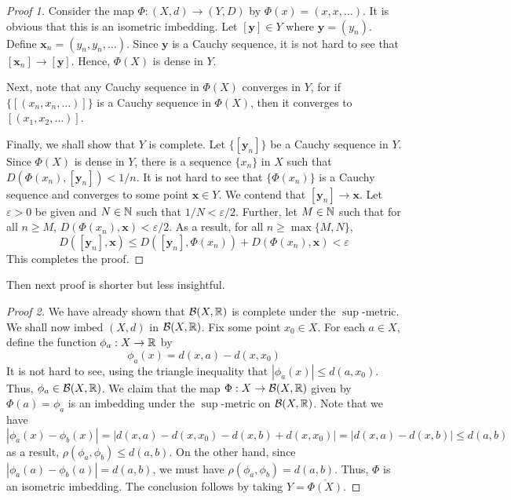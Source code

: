 \begin{proof}[Proof 1]
    Consider the map $\Phi:(X,d)\to(Y,D)$ by $\Phi(x) = (x,x,\ldots)$. It is obvious that this is an isometric imbedding. Let $[\mathbf y]\in Y$ where $\mathbf y = (y_n)$. Define $\mathbf x_n = (y_n,y_n,\ldots)$. Since $\mathbf y$ is a Cauchy sequence, it is not hard to see that $[\mathbf x_n]\to[\mathbf y]$. Hence, $\Phi(X)$ is dense in $Y$. 

    Next, note that any Cauchy sequence in $\Phi(X)$ converges in $Y$, for if $\{[(x_n,x_n,\ldots)]\}$ is a Cauchy sequence in $\Phi(X)$, then it converges to $[(x_1,x_2,\ldots)]$.

    Finally, we shall show that $Y$ is complete. Let $\{[\mathbf y_n]\}$ be a Cauchy sequence in $Y$. Since $\Phi(X)$ is dense in $Y$, there is a sequence $\{x_n\}$ in $X$ such that $D(\Phi(x_n), [\mathbf y_n]) < 1/n$. It is not hard to see that $\{\Phi(x_n)\}$ is a Cauchy sequence and converges to some point $\mathbf x\in Y$. We contend that $[\mathbf y_n]\to\mathbf x$. Let $\varepsilon > 0$ be given and $N\in\mathbb{N}$ such that $1/N < \varepsilon/2$. Further, let $M\in\mathbb{N}$ such that for all $n\ge M$, $D(\Phi(x_n),\mathbf x) < \varepsilon/2$. As a result, for all $n\ge\max\{M, N\}$,
    \begin{equation*}
        D([\mathbf y_n],\mathbf x)\le D([\mathbf y_n],\Phi(x_n)) + D(\Phi(x_n), \mathbf x) < \varepsilon
    \end{equation*}
    This completes the proof.
\end{proof}

Then next proof is shorter but less insightful.
\begin{proof}[Proof 2]
    We have already shown that $\mathcal{B}(X,\mathbb{R})$ is complete under the $\sup$-metric. We shall now imbed $(X,d)$ in $\mathcal{B}(X,\mathbb{R})$. Fix some point $x_0\in X$. For each $a\in X$, define the function $\phi_a: X\to\mathbb{R}$ by 
    \begin{equation*}
        \phi_a(x) = d(x,a) - d(x,x_0)
    \end{equation*}
    It is not hard to see, using the triangle inequality that $|\phi_a(x)|\le d(a, x_0)$. Thus, $\phi_a\in\mathcal{B}(X,\mathbb{R})$. We claim that the map $\Phi:X\to\mathcal{B}(X,\mathbb{R})$ given by $\Phi(a) = \phi_a$ is an imbedding under the $\sup$-metric on $\mathcal{B}(X,\mathbb{R})$. Note that we have 
    \begin{equation*}
        |\phi_a(x) - \phi_b(x)| = |d(x,a) - d(x,x_0) - d(x,b) + d(x,x_0)| = |d(x,a) - d(x,b)|\le d(a,b)
    \end{equation*}
    as a result, $\rho(\phi_a,\phi_b)\le d(a,b)$. On the other hand, since $|\phi_a(a) - \phi_b(a)| = d(a,b)$, we must have $\rho(\phi_a,\phi_b) = d(a,b)$. Thus, $\Phi$ is an isometric imbedding. The conclusion follows by taking $Y = \overline{\Phi(X)}$.
\end{proof}

